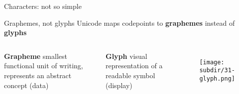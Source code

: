 \documentclass[../index.tex]{subfiles}
\begin{document}
\renewcommand{\currenttitle}{Characters: not so simple}
\begin{frame}{\currenttitle}
%
%
%
%
\end{frame}
\renewcommand{\currenttitle}{Graphemes, not glyphs}
\begin{frame}{\currenttitle}
%
%
%
%
  Unicode maps codepoints to \textbf{graphemes} instead of \textbf{glyphs} \\[1.5em]
  \begin{columns}[t]
    \textbf{Grapheme} \textendash{} smallest functional unit of writing, represents an
      abstract concept (data)

    \textbf{Glyph} \textendash{} visual representation of a readable symbol (display) \\[1em]
    \begin{figure}
      \centering
      \texttt{[image: \\subdir/31-glyph.png]}
    \end{figure}
  \end{columns}
\end{frame}
\end{document}
